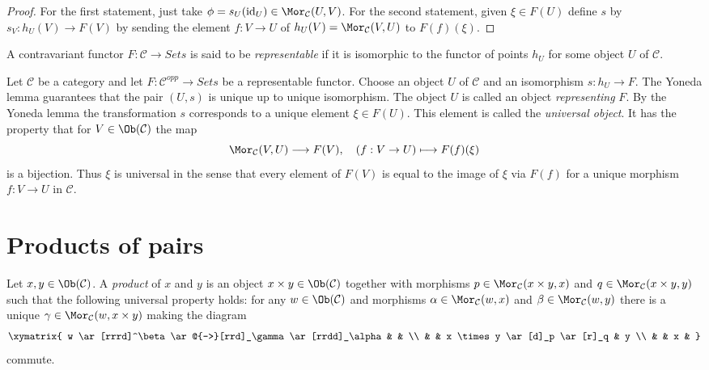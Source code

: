 \begin{proof}
For the first statement, just take
$\phi = s_U(\text{id}_U) \in \Mor_\mathcal{C}(U, V)$.
For the second statement, given $\xi \in F(U)$ define
$s$ by $s_V : h_U(V) \to F(V)$ by sending the element $f : V \to U$
of $h_U(V) = \Mor_\mathcal{C}(V, U)$ to $F(f)(\xi)$.
\end{proof}

\begin{definition}
\label{definition-representable-functor}
A contravariant functor $F : \mathcal{C}\to \textit{Sets}$ is said
to be {\it representable} if it is isomorphic to the functor of
points $h_U$ for some object $U$ of $\mathcal{C}$.
\end{definition}

\noindent
Let $\mathcal{C}$ be a category and let
$F : \mathcal{C}^{opp} \to \textit{Sets}$ be a representable functor.
Choose an object $U$ of $\mathcal{C}$ and an isomorphism $s : h_U \to F$.
The Yoneda lemma guarantees that the pair $(U, s)$
is unique up to unique isomorphism. The object
$U$ is called an object {\it representing} $F$.
By the Yoneda lemma the transformation $s$ corresponds to a unique
element $\xi \in F(U)$. This element is called the {\it universal object}.
It has the property that for $V \in \Ob(\mathcal{C})$ the map
$$
\Mor_\mathcal{C}(V, U) \longrightarrow F(V),\quad
(f : V \to U) \longmapsto F(f)(\xi)
$$
is a bijection. Thus $\xi$ is universal in the sense that every element
of $F(V)$ is equal to the image of $\xi$ via $F(f)$ for a unique morphism
$f : V \to U$ in $\mathcal{C}$.






\section{Products of pairs}
\label{section-products-pairs}

\begin{definition}
\label{definition-products}
Let $x, y\in \Ob(\mathcal{C})$.
A {\it product} of $x$ and $y$ is
an object $x \times y \in \Ob(\mathcal{C})$
together with morphisms
$p\in \Mor_{\mathcal C}(x \times y, x)$ and
$q\in\Mor_{\mathcal C}(x \times y, y)$ such
that the following universal property holds: for
any $w\in \Ob(\mathcal{C})$ and morphisms
$\alpha \in \Mor_{\mathcal C}(w, x)$ and
$\beta \in \Mor_\mathcal{C}(w, y)$
there is a unique
$\gamma\in \Mor_{\mathcal C}(w, x \times y)$ making
the diagram
$$
\xymatrix{
w \ar[rrrd]^\beta \ar@{-->}[rrd]_\gamma \ar[rrdd]_\alpha & & \\
& & x \times y \ar[d]_p \ar[r]_q & y \\
& & x &
}
$$
commute.
\end{definition}

